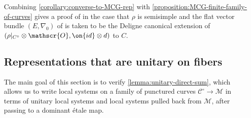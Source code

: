 \begin{remark}
\notready
	\label{remark:cousin-heu}
	Combining \autoref{corollary:converse-to-MCG-rep} with
	\autoref{proposition:MCG-finite-family-of-curves} gives a proof of
	\cite[Theorem A]{CH:isomonodromic}
	in the case that $\rho$ is semisimple and the flat vector bundle $(E, \nabla_0)$
	of \cite[Theorem A]{CH:isomonodromic}
	is taken to be the Deligne canonical extension of
	$(\rho|_{C^\circ}\otimes \mathscr{O}, \on{id}\otimes d)$ to $C$.
\end{remark}



\subsection{Representations that are unitary on fibers}
\label{subsection:unitary-on-fibers}

The main goal of this section is to verify
\autoref{lemma:unitary-direct-sum}, which allows us to write local systems on a family of punctured curves $\mathscr{C}^\circ\to \mathscr{M}$ in terms of unitary local systems and local systems pulled back from $\mathscr{M}$, after passing to a dominant \'etale
map.

